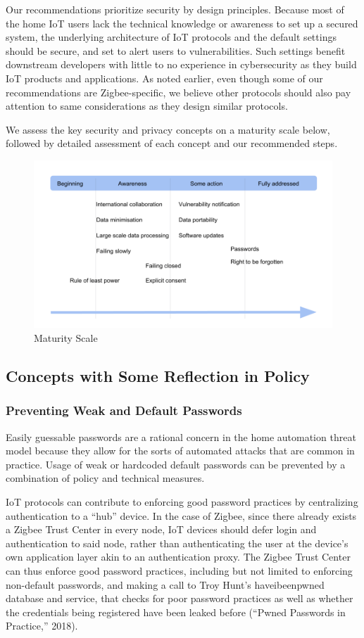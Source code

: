 Our recommendations prioritize security by design principles. Because most of the home IoT users lack the technical knowledge or awareness to set up a secured system, the underlying architecture of IoT protocols and the default settings should be secure, and set to alert users to vulnerabilities. Such settings benefit downstream developers with little to no experience in cybersecurity as they build IoT products and applications. As noted earlier, even though some of our recommendations are Zigbee-specific, we believe other protocols should also pay attention to same considerations as they design similar protocols.

We assess the key security and privacy concepts on a maturity scale below, followed by detailed assessment of each concept and our recommended steps.

\begin{figure}[h]
	\caption{Maturity Scale}
	\includegraphics[width=1.0\textwidth]{table}
\end{figure}

\subsection{Concepts with Some Reflection in Policy}

\subsubsection{Preventing Weak and Default Passwords}
Easily guessable passwords are a rational concern in the home automation threat model because they allow for the sorts of automated attacks that are common in practice. Usage of weak or hardcoded default passwords can be prevented by a combination of policy and technical measures.

  IoT protocols can contribute to enforcing good password practices by centralizing authentication to a “hub” device. In the case of Zigbee, since there already exists a Zigbee Trust Center in every node, IoT devices should defer login and authentication to said node, rather than authenticating the user at the device’s own application layer akin to an authentication proxy. The Zigbee Trust Center can thus enforce good password practices, including but not limited to enforcing non-default passwords, and making a call to Troy Hunt’s haveibeenpwned database and service, that checks for poor password practices as well as whether the credentials being registered have been leaked before (“Pwned Passwords in Practice,” 2018).

